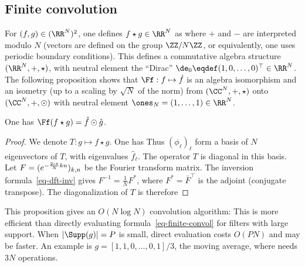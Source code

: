 \subsection{Finite convolution}

For $(f,g) \in (\RR^{N})^2$, one defines $f\star g \in \RR^N$ as
where $+$ and $-$ are interpreted modulo $N$ (vectors are defined on the group $\ZZ/N\ZZ$, or equivalently, one uses periodic boundary conditions).
%
This defines a commutative algebra structure $(\RR^N,+,\star)$, with neutral element the ``Dirac'' $\de_0 \eqdef (1,0,\ldots,0)^\top \in \RR^N$. The following proposition shows that $\Ff : f \mapsto \hat f$ is an algebra isomorphism and an isometry (up to a scaling by $\sqrt{N}$ of the norm) from $(\CC^N,+,\star)$ onto $(\CC^N,+,\odot)$ with neutral element $\ones_N=(1,\ldots,1) \in \RR^N$.

\begin{prop}\label{prop-tfd-conv}
	One has $\Ff( f \star g ) = \hat f \odot \hat g$. 
\end{prop}
\begin{proof}
	We denote $T : g \mapsto f \star g$. One has 
	Thus $(\phi_\ell)_\ell$ form a basis of $N$ eigenvectors of $T$, with eigenvalues $\hat f_\ell$. The operator $T$ is diagonal in this basis. Let $F=(  e^{ -\frac{2\imath\pi}{N} k n } )_{k,n}$ be the Fourier transform matrix. The inversion formula~\eqref{eq-dft-inv} gives $F^{-1} = \frac{1}{N}F^*$, where $F^*=\bar F^\top$ is the adjoint (conjugate transpose). The diagonalization of $T$ is therefore
\end{proof}

This proposition gives an $O(N\log N)$ convolution algorithm:
This is more efficient than directly evaluating formula~\eqref{eq-finite-convol} for filters with large support. When $|\Supp(g)|=P$ is small, direct evaluation costs $O(PN)$ and may be faster. An example is $g=[1,1,0,\ldots,0,1]/3$, the moving average, where
needs $3N$ operations.


